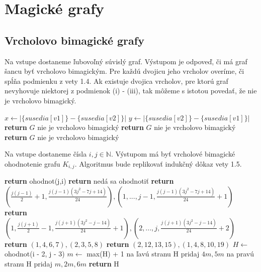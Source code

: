 \section{Magické grafy}

\subsection{Vrcholovo bimagické grafy}
 
\begin{subalg} Na vstupe dostaneme ľubovoľný súvislý graf. Výstupom je odpoveď, či má graf šancu byť vrcholovo bimagickým. Pre každú dvojicu jeho vrcholov overíme, či spĺňa podmienku z vety 1.4. Ak existuje dvojica vrcholov, pre ktorú graf nevyhovuje niektorej z podmienok (i) - (iii), tak môžeme s istotou povedať, že nie je vrcholovo bimagický.
\end{subalg}

\begin{algorithmic}
    \STATE $x \gets |\{susedia[v1]\} - \{susedia[v2]\}|$
    \STATE $y \gets |\{susedia[v2]\} - \{susedia[v1]\}|$
	\STATE \textbf{return} $G$ nie je vrcholovo bimagický
    \ENDIF
	\STATE \textbf{return} $G$ nie je vrcholovo bimagický
    \ENDIF
	\STATE \textbf{return} $G$ nie je vrcholovo bimagický
    \ENDIF
\ENDFOR
\end{algorithmic}


\begin{subalg} Na vstupe dostaneme čísla $i,j \in \mathbb{N}$. Výstupom má byť vrcholové bimagické ohodnotenie grafu $K_{i,j}$. Algoritmus bude replikovať indukčný dôkaz vety 1.5.
\end{subalg}

\begin{algorithmic}
	\STATE \textbf{return} ohodnot(j,i)
\ENDIF
{}
	\STATE \textbf{return} nedá sa ohodnotiť
\ENDIF
{}
	\STATE \textbf{return} $(\frac{j(j-1)}{2} + 1, \frac{j(j-1)(3j^2-7j+14)}{24}), (1, ... , j-1, \frac{j(j-1)(3j^2-7j+14)}{24} + 1)$
\ENDIF
{}
	\STATE \textbf{return} $(1, \frac{j(j+1)}{2} - 1, \frac{j(j+1)(3j^2-j-14)}{24} + 1), (2, ... , j, \frac{j(j+1)(3j^2-j-14)}{24} + 2)$
\ENDIF
{}
	\STATE \textbf{return} $(1, 4, 6, 7), (2, 3, 5, 8)$
\ENDIF
{}
	\STATE \textbf{return} $(2, 12, 13, 15), (1, 4, 8, 10, 19)$
\ENDIF
\STATE $H \gets$ ohodnot(i - 2, j - 3)
\STATE $m \gets$ max(H) + 1
\STATE na ľavú stranu H pridaj $4m, 5m$
\STATE na pravú stranu H pridaj $m, 2m, 6m$
\STATE \textbf{return} H
\end{algorithmic}

